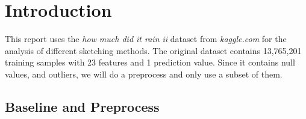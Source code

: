 \section{Introduction}
\label{sec:intro}

This report uses the \emph{how much did it rain ii} \cite{rain, Lakshmanan16}
dataset from \emph{kaggle.com} for the analysis of different sketching methods.
The original dataset contains 13,765,201 training samples
with 23 features and 1 prediction value.
Since it contains null values, and outliers,
we will do a preprocess and only use a subset of them.

\subsection{Baseline and Preprocess}
